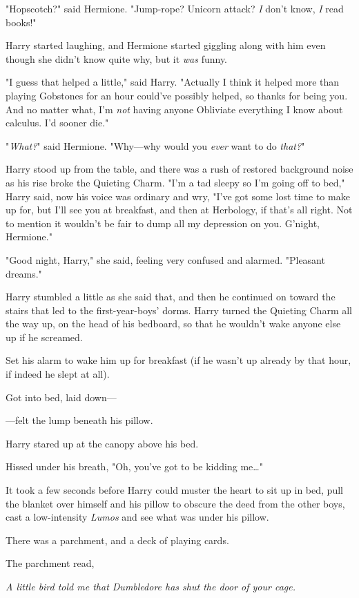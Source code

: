 "Hopscotch?" said Hermione. "Jump-rope? Unicorn attack? \emph{I} don't know, 
\emph{I} read books!"

Harry started laughing, and Hermione started giggling along with him even 
though she didn't know quite why, but it \emph{was} funny.

"I guess that helped a little," said Harry. "Actually I think it helped more 
than playing Gobstones for an hour could've possibly helped, so thanks for 
being you. And no matter what, I'm \emph{not} having anyone Obliviate 
everything I know about calculus. I'd sooner die."

"\emph{What?}" said Hermione. "Why---why would you \emph{ever} want to do 
\emph{that?}"

Harry stood up from the table, and there was a rush of restored background 
noise as his rise broke the Quieting Charm. "I'm a tad sleepy so I'm going off 
to bed," Harry said, now his voice was ordinary and wry, "I've got some lost 
time to make up for, but I'll see you at breakfast, and then at Herbology, if 
that's all right. Not to mention it wouldn't be fair to dump all my depression 
on you. G'night, Hermione."

"Good night, Harry," she said, feeling very confused and alarmed. "Pleasant 
dreams."

Harry stumbled a little as she said that, and then he continued on toward the 
stairs that led to the first-year-boys' dorms.
\sbreak
Harry turned the Quieting Charm all the way up, on the head of his bedboard, so 
that he wouldn't wake anyone else up if he screamed.

Set his alarm to wake him up for breakfast (if he wasn't up already by that 
hour, if indeed he slept at all).

Got into bed, laid down---

---felt the lump beneath his pillow.

Harry stared up at the canopy above his bed.

Hissed under his breath, "Oh, you've got to be kidding me{\ldots}"

It took a few seconds before Harry could muster the heart to sit up in bed, 
pull the blanket over himself and his pillow to obscure the deed from the other 
boys, cast a low-intensity \emph{Lumos} and see what was under his pillow.

There was a parchment, and a deck of playing cards.

The parchment read,

\emph{A little bird told me that Dumbledore has shut the door of your cage.}

